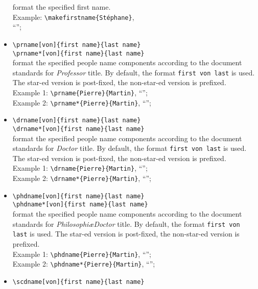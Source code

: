 \documentclass[book,taskpackage,specpackage,codepackage]{upmethodology-document}
\begin{document}
\begin{itemize}
	format the specified first name. \\
	Example: \texttt{{\textbackslash}makefirstname\{St\'ephane\}}, \\
		``'';
\item \texttt{{\textbackslash}prname[von]\{first name\}\{last name\}} \\
      \texttt{{\textbackslash}prname*[von]\{first name\}\{last name\}} \\
	format the specified people name components according to the document standards for \emph{Professor} title. By default, the format \texttt{first von last} is used. The star-ed version is post-fixed, the non-star-ed version is prefixed. \\
	Example 1: \texttt{{\textbackslash}prname\{Pierre\}\{Martin\}}, ``''; \\
	Example 2: \texttt{{\textbackslash}prname*\{Pierre\}\{Martin\}}, ``'';
\item \texttt{{\textbackslash}drname[von]\{first name\}\{last name\}} \\
      \texttt{{\textbackslash}drname*[von]\{first name\}\{last name\}} \\
	format the specified people name components according to the document standards for \emph{Doctor} title. By default, the format \texttt{first von last} is used. The star-ed version is post-fixed, the non-star-ed version is prefixed. \\
	Example 1: \texttt{{\textbackslash}drname\{Pierre\}\{Martin\}}, ``''; \\
	Example 2: \texttt{{\textbackslash}drname*\{Pierre\}\{Martin\}}, ``'';
\item \texttt{{\textbackslash}phdname[von]\{first name\}\{last name\}} \\
      \texttt{{\textbackslash}phdname*[von]\{first name\}\{last name\}} \\
	format the specified people name components according to the document standards for \emph{Philosophi\ae Doctor} title. By default, the format \texttt{first von last} is used. The star-ed version is post-fixed, the non-star-ed version is prefixed. \\
	Example 1: \texttt{{\textbackslash}phdname\{Pierre\}\{Martin\}}, ``''; \\
	Example 2: \texttt{{\textbackslash}phdname*\{Pierre\}\{Martin\}}, ``'';
\item \texttt{{\textbackslash}scdname[von]\{first name\}\{last name\}} \\

\end{itemize}
\end{document}
